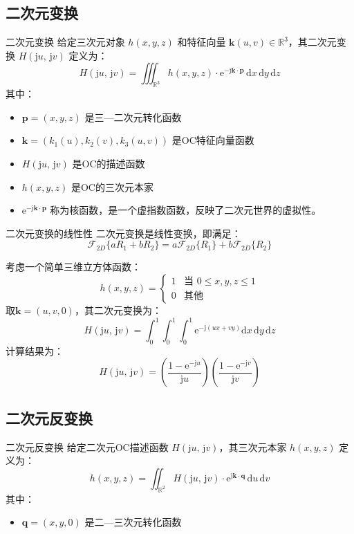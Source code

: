 \documentclass[lang=cn,newtx,10pt,scheme=chinese]{elegantbook}
\newcommand{\md}{\mathrm{d}}
\newcommand{\me}{\mathrm{e}}
\newcommand{\mj}{\mathrm{j}}
\begin{document}
\subsection{二次元变换}

\begin{definition}{二次元变换}
    给定三次元对象 \( h(x,y,z) \) 和特征向量 \(\bm{k}(u,v) \in \mathbb{R}^3\)，其二次元变换 \( H(\mj u,\,\mj v) \) 定义为：
    \[
        H(\mj u,\,\mj v) = \iiint_{\mathbb{R}^3} h(x,y,z) \cdot \me^{-\mj \bm{k} \cdot \bm{p}} \,\md x\,\md y\,\md z
    \]
    其中：
    \begin{itemize}
        \item \(\bm{p}=(x,y,z)\) 是三—二次元转化函数
        \item \(\bm{k}=(k_1(u),k_2(v),k_3(u,v))\) 是OC特征向量函数
        \item \(H(\mj u,\,\mj v)\) 是OC的描述函数
        \item \(h(x,y,z)\) 是OC的三次元本家
        \item \(\me^{-\mj \bm{k} \cdot \bm{p}}\) 称为核函数，是一个虚指数函数，反映了二次元世界的虚拟性。
    \end{itemize}
\end{definition}

\begin{theorem}{二次元变换的线性性}
    二次元变换是线性变换，即满足：
    \[
        \mathcal{F}_{2D}\{aR_1 + bR_2\} = a\mathcal{F}_{2D}\{R_1\} + b\mathcal{F}_{2D}\{R_2\}
    \]
\end{theorem}

\begin{example}
    考虑一个简单三维立方体函数：
    \[ h(x,y,z) = \begin{cases}
            1 & \text{当 } 0 \leq x,y,z \leq 1 \\
            0 & \text{其他}
        \end{cases} \]
    取\(\bm{k}=(u,v,0)\)，其二次元变换为：
    \[ H(\mj u,\,\mj v) = \int_0^1 \int_0^1 \int_0^1 \me^{-\mj (ux + vy)} \md x\,\md y\,\md z \]
    计算结果为：
    \[ H(\mj u,\,\mj v) = \left(\frac{1 - \me^{-\mj u}}{\mj u}\right)\left(\frac{1 - \me^{-\mj v}}{\mj v}\right)
    \]
\end{example}

\subsection{二次元反变换}

\begin{definition}{二次元反变换}
    给定二次元OC描述函数 \( H(\mj u,\,\mj v) \)，其三次元本家 \( h(x,y,z) \) 定义为：
    \[
        h(x,y,z) = \iint_{\mathbb{R}^2} H(\mj u,\,\mj v) \cdot \me^{\mj \bm{k} \cdot \bm{q}} \,\md u\,\md v
    \]
    其中：
    \begin{itemize}
        \item \(\bm{q}=(x,y,0)\) 是二—三次元转化函数
    \end{itemize}
\end{definition}
\end{document}
